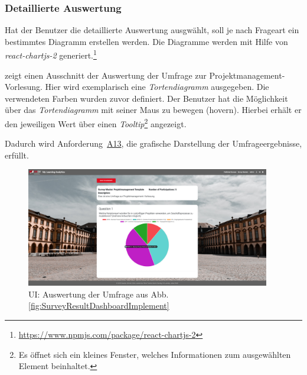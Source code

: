 \subsubsection*{Detaillierte Auswertung}
Hat der Benutzer die detaillierte Auswertung ausgwählt, soll je nach Frageart ein bestimmtes Diagramm erstellen werden. 
Die Diagramme werden mit Hilfe von \emph{react-chartjs-2} generiert.\footnote{\url{https://www.npmjs.com/package/react-chartjs-2}} 

\abb {} zeigt einen Ausschnitt der Auswertung der Umfrage zur Projektmanagement-Vorlesung. 
Hier wird exemplarisch eine \emph{Tortendiagramm} ausgegeben. 
Die verwendeten Farben wurden zuvor definiert. 
Der Benutzer hat die Möglichkeit über das \emph{Tortendiagramm} mit seiner Maus zu bewegen (hovern).
Hierbei erhält er den jeweiligen Wert über einen \emph{Tooltip}\footnote{Es öffnet sich ein kleines Fenster, welches Informationen zum ausgewählten Element beinhaltet.} angezeigt.

Dadurch wird Anforderung~\hyperref[Anf:A13]{A13}, die grafische Darstellung der Umfrageergebnisse, erfüllt.

\begin{figure}[!htb]
	\centering
	\includegraphics[width=0.95\textwidth, keepaspectratio]{img/client/SurveyResultDetail2.png}
	\captionsetup{justification=centering, format=plain}
	\caption[\acf{UI}: Auswertung der Umfrage]{\acf{UI}: Auswertung der Umfrage aus Abb. \vref{fig:SurveyResultDashboardImplement} \\ \quelleScreenshot}
	\label{fig:SurveyResultDetailImplement}
\end{figure}
